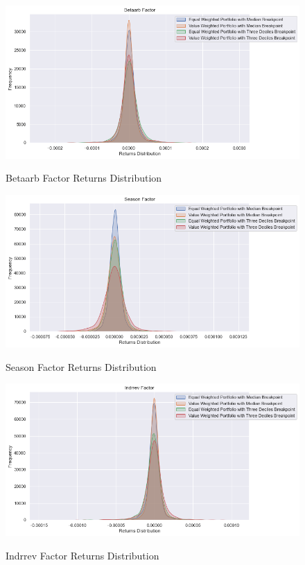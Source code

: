 \begin{figure}[H]
	\caption{Betaarb Factor Returns Distribution}
	\centering
	\includegraphics[scale=.63]{../../output/figures/betaarb.png}
	\label{fig:betaarb}
\end{figure}

\begin{figure}[H]
	\caption{Season Factor Returns Distribution}
	\centering
	\includegraphics[scale=.63]{../../output/figures/season.png}
	\label{fig:season}
\end{figure}

\begin{figure}[H]
	\caption{Indrrev Factor Returns Distribution}
	\centering
	\includegraphics[scale=.63]{../../output/figures/indrrev.png}
	\label{fig:indrrev}
\end{figure}

